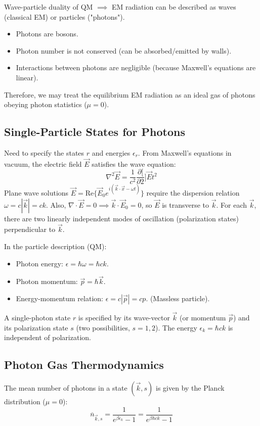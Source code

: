 \documentclass[11pt]{article}
\newcommand{\pderiv}[2]{\frac{\partial #1}{\partial #2}}
\newcommand{\eps}{\epsilon}
\newcommand{\nbar}{\overline{n}} %
\begin{document}
Wave-particle duality of QM $\implies$ EM radiation can be described as waves (classical EM) or particles ("photons").
\begin{itemize}
    \item Photons are bosons.
    \item Photon number is not conserved (can be absorbed/emitted by walls).
    \item Interactions between photons are negligible (because Maxwell's equations are linear).
\end{itemize}
Therefore, we may treat the equilibrium EM radiation as an ideal gas of photons obeying photon statistics ($\mu=0$).

\subsection*{Single-Particle States for Photons}

Need to specify the states $r$ and energies $\eps_r$.
From Maxwell's equations in vacuum, the electric field $\vec{E}$ satisfies the wave equation:
\[ \nabla^2 \vec{E} = \frac{1}{c^2} \pderiv[2]{\vec{E}}{t^2} \]
Plane wave solutions $\vec{E} = \text{Re}\{\vec{E}_0 e^{i(\vec{k}\cdot\vec{x} - \omega t)}\}$ require the dispersion relation $\omega = c |\vec{k}| = ck$.
Also, $\nabla \cdot \vec{E} = 0 \implies \vec{k} \cdot \vec{E}_0 = 0$, so $\vec{E}$ is transverse to $\vec{k}$. For each $\vec{k}$, there are two linearly independent modes of oscillation (polarization states) perpendicular to $\vec{k}$.

In the particle description (QM):
\begin{itemize}
    \item Photon energy: $\eps = \hbar\omega = \hbar c k$.
    \item Photon momentum: $\vec{p} = \hbar\vec{k}$.
    \item Energy-momentum relation: $\eps = c |\vec{p}| = cp$. (Massless particle).
\end{itemize}
A single-photon state $r$ is specified by its wave-vector $\vec{k}$ (or momentum $\vec{p}$) and its polarization state $s$ (two possibilities, $s=1, 2$).
The energy $\eps_k = \hbar c k$ is independent of polarization.

\subsection*{Photon Gas Thermodynamics}

The mean number of photons in a state $(\vec{k}, s)$ is given by the Planck distribution ($\mu=0$):
\[ \nbar_{\vec{k}, s} = \frac{1}{e^{\beta \eps_k} - 1} = \frac{1}{e^{\beta \hbar c k} - 1} \]
\end{document}
